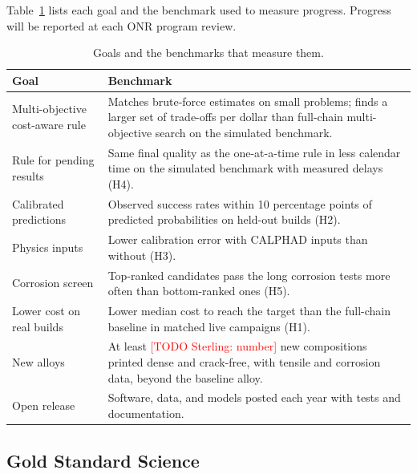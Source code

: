 \documentclass[12pt,letterpaper]{article}
\newcommand{\todo}[1]{\textcolor{red}{[TODO Sterling: #1]}}
\begin{document}
Table~\ref{tab:goals} lists each goal and the benchmark used to measure
progress. Progress will be reported at each ONR program review.

\begin{table}[h]
\centering
\caption{Goals and the benchmarks that measure them.}
\label{tab:goals}
\renewcommand{\arraystretch}{1.15}
\begin{tabularx}{\textwidth}{@{}>{\raggedright\arraybackslash}p{1.75in}>{\raggedright\arraybackslash}X@{}}
\toprule
\textbf{Goal} & \textbf{Benchmark} \\
\midrule
Multi-objective cost-aware rule & Matches brute-force estimates on small
problems; finds a larger set of trade-offs per dollar than full-chain
multi-objective search on the simulated benchmark. \\
Rule for pending results & Same final quality as the one-at-a-time rule in
less calendar time on the simulated benchmark with measured delays (H4). \\
Calibrated predictions & Observed success rates within 10 percentage points
of predicted probabilities on held-out builds (H2). \\
Physics inputs & Lower calibration error with CALPHAD inputs than without
(H3). \\
Corrosion screen & Top-ranked candidates pass the long corrosion tests more
often than bottom-ranked ones (H5). \\
Lower cost on real builds & Lower median cost to reach the target than the
full-chain baseline in matched live campaigns (H1). \\
New alloys & At least \todo{number} new compositions printed dense and
crack-free, with tensile and corrosion data, beyond the baseline alloy. \\
Open release & Software, data, and models posted each year with tests and
documentation. \\
\bottomrule
\end{tabularx}
\end{table}

\subsection{Gold Standard Science}
\end{document}

